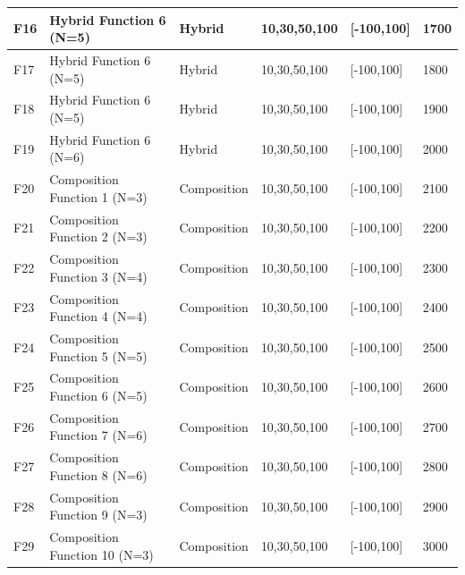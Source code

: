 \documentclass{article} %
\begin{document}
\begin{tabular}{|p{0.3in}|p{1.5in}|p{0.5in}|p{0.5in}|p{0.5in}|p{0.5in}|}
F16 & Hybrid Function 6 (N=5) & Hybrid & 10,30,50,100 & [-100,100] & 1700 \\ \hline 
F17 & Hybrid Function 6 (N=5) & Hybrid & 10,30,50,100 & [-100,100] & 1800 \\ \hline 
F18 & Hybrid Function 6 (N=5) & Hybrid & 10,30,50,100 & [-100,100] & 1900 \\ \hline 
F19 & Hybrid Function 6 (N=6) & Hybrid & 10,30,50,100 & [-100,100] & 2000 \\ \hline 
F20 & Composition Function 1 (N=3) & Composition & 10,30,50,100 & [-100,100] & 2100 \\ \hline 
F21 & Composition Function 2 (N=3) & Composition & 10,30,50,100 & [-100,100] & 2200 \\ \hline 
F22 & Composition Function 3 (N=4) & Composition & 10,30,50,100 & [-100,100] & 2300 \\ \hline 
F23 & Composition Function 4 (N=4) & Composition & 10,30,50,100 & [-100,100] & 2400 \\ \hline 
F24 & Composition Function 5 (N=5) & Composition & 10,30,50,100 & [-100,100] & 2500 \\ \hline 
F25 & Composition Function 6 (N=5) & Composition & 10,30,50,100 & [-100,100] & 2600 \\ \hline 
F26 & Composition Function 7 (N=6) & Composition & 10,30,50,100 & [-100,100] & 2700 \\ \hline 
F27 & Composition Function 8 (N=6) & Composition & 10,30,50,100 & [-100,100] & 2800 \\ \hline 
F28 & Composition Function 9 (N=3) & Composition & 10,30,50,100 & [-100,100] & 2900 \\ \hline 
F29 & Composition Function 10 (N=3) & Composition & 10,30,50,100 & [-100,100] & 3000 \\ \hline 
\end{tabular}
\end{document}
